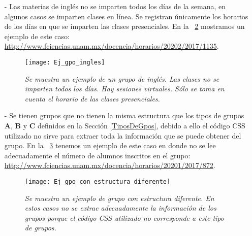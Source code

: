 \begin{itemize}
En la \figurename{~\ref{horariosMultiples}} tenemos un ejemplo de este caso: \url{http://www.fciencias.unam.mx/docencia/horarios/20181/2055/1323}. El profesor imparte su clase los lunes, miércoles y viernes de 13-14hrs en el salón O215, hay una ayudantía los martes y jueves de 13-14hrs en el salón O215 y otra ayudantía los martes de 11-13hrs en el salón 304 (Yelizcalli). Se considera que esta materia inicia a las 13hrs y se imparte en el salón O215.

\begin{figure}[H]
\centering
\texttt{[image: Ej\_gpo\_horarios\_multiples]} %
\caption[\textit{Grupo con horarios múltiples}]{\textit{Se muestra un ejemplo de grupo con horarios múltiples. En estos grupos sólo se toman en cuenta los horarios y salones en los que los profesores imparten clase.}}\label{horariosMultiples}
\end{figure}

\item[-] Las materias de inglés no se imparten todos los días de la semana, en algunos casos se imparten clases en línea. Se registran únicamente los horarios de los días en que se imparten las clases presenciales. En la \figurename{~\ref{casoIngles}} mostramos un ejemplo de este caso: \url{http://www.fciencias.unam.mx/docencia/horarios/20202/2017/1135}.

\begin{figure}[H]
\centering
\texttt{[image: Ej\_gpo\_ingles]} %
\caption[\textit{Grupo de inglés}]{\textit{Se muestra un ejemplo de un grupo de inglés. Las clases no se imparten todos los días. Hay sesiones virtuales. Sólo se toma en cuenta el horario de las clases presenciales.}}\label{casoIngles}
\end{figure}

\item[-] Se tienen grupos que no tienen la misma estructura que los tipos de grupos \textbf{A}, \textbf{B} y \textbf{C} definidos en la Sección \ref{TiposDeGpos}, debido a ello el código CSS utilizado no sirve para extraer toda la información que se puede obtener del grupo. En la \figurename{~\ref{GpoEstructuraDiferente}} tenemos un ejemplo de este caso en donde no se lee adecuadamente el número de alumnos inscritos en el grupo: \url{http://www.fciencias.unam.mx/docencia/horarios/20201/2017/872}.

\begin{figure}[H]
\centering
\texttt{[image: Ej\_gpo\_con\_estructura\_diferente]} %
\caption[\textit{Grupo con estructura diferente}]{\textit{Se muestra un ejemplo de grupo con estructura diferente. En estos casos no se extrae adecuadamente la información de los grupos porque el código CSS utilizado no corresponde a este tipo de grupos.}}\label{GpoEstructuraDiferente}
\end{figure}

\end{itemize}